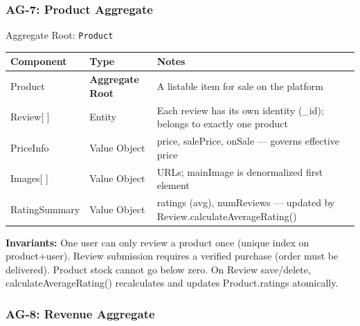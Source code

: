 \documentclass[12pt,a4paper]{article}
\begin{document}
\subsubsection{AG-7: Product Aggregate}

\begin{infobox}{Aggregate Root: \texttt{Product}}
\begin{tabular}{@{}p{3cm}p{2.8cm}p{7.8cm}@{}}
\textbf{Component} & \textbf{Type} & \textbf{Notes} \\
\hline
Product & \textbf{Aggregate Root} & A listable item for sale on the platform \\
Review[ ] & Entity & Each review has its own identity (\_id); belongs to exactly one product \\
PriceInfo & Value Object & price, salePrice, onSale — governs effective price \\
Images[ ] & Value Object & URLs; mainImage is denormalized first element \\
RatingSummary & Value Object & ratings (avg), numReviews — updated by Review.calculateAverageRating() \\
\end{tabular}

\textbf{Invariants:} One user can only review a product once (unique index on product+user). Review submission requires a verified purchase (order must be delivered). Product stock cannot go below zero. On Review save/delete, calculateAverageRating() recalculates and updates Product.ratings atomically.
\end{infobox}

\subsubsection{AG-8: Revenue Aggregate}
\end{document}
